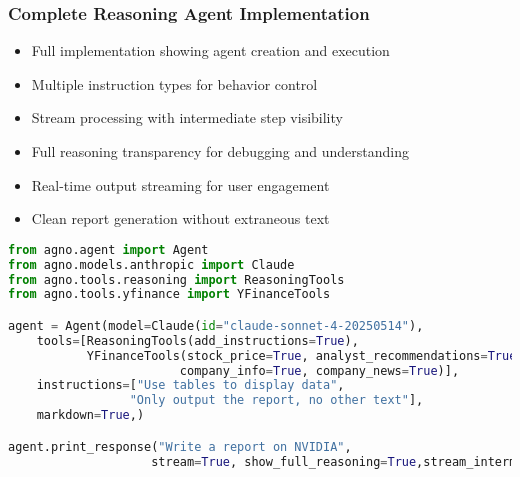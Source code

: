 \begin{frame}[fragile]\frametitle{Complete Reasoning Agent Implementation}
      \begin{itemize}
	\item Full implementation showing agent creation and execution
	\item Multiple instruction types for behavior control
	\item Stream processing with intermediate step visibility
	\item Full reasoning transparency for debugging and understanding
	\item Real-time output streaming for user engagement
	\item Clean report generation without extraneous text
	  \end{itemize}
      
      \begin{lstlisting}[language=python, basicstyle=\tiny]
from agno.agent import Agent
from agno.models.anthropic import Claude
from agno.tools.reasoning import ReasoningTools
from agno.tools.yfinance import YFinanceTools

agent = Agent(model=Claude(id="claude-sonnet-4-20250514"),
    tools=[ReasoningTools(add_instructions=True),
           YFinanceTools(stock_price=True, analyst_recommendations=True,
                        company_info=True, company_news=True)],
    instructions=["Use tables to display data",
                 "Only output the report, no other text"],
    markdown=True,)

agent.print_response("Write a report on NVIDIA",
                    stream=True, show_full_reasoning=True,stream_intermediate_steps=True)
      \end{lstlisting}
\end{frame}


